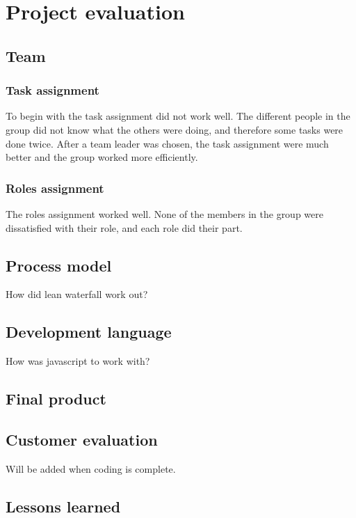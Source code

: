 \chapter{Project evaluation}

\section{Team}

\subsection*{Task assignment}
To begin with the task assignment did not work well. The different people in 
the group did not know what the others were doing, and therefore some tasks were done twice.
After a team leader was chosen, the task assignment were much better and the group worked more efficiently. 

\subsection*{Roles assignment}
The roles assignment worked well. None of the members in the group were dissatisfied with their role, and each role
did their part.
\section{Process model}

How did lean waterfall work out?

\section{Development language}

How was javascript to work with?

\section{Final product}

\section{Customer evaluation}

Will be added when coding is complete.

\section{Lessons learned}


